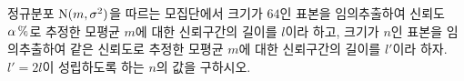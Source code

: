 정규분포 $\mathrm{N}(m{,}\mkern3mu\mathopen{}\sigma^2)$을 따르는 모집단에서 크기가 $64$인 표본을 임의추출하여 신뢰도 $\alpha\mkern3mu \%$로 추정한 모평균 $m$에 대한 신뢰구간의 길이를 $l$이라 하고, 크기가 $n$인 표본을 임의추출하여 같은 신뢰도로 추정한 모평균 $m$에 대한 신뢰구간의 길이를 $l'$이라 하자. $l'=2l$이 성립하도록 하는 $n$의 값을 구하시오.
